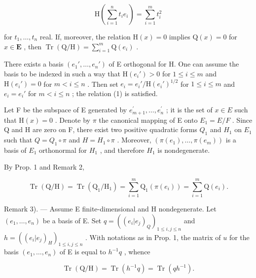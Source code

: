 \[
\mathrm{H} \left(\sum_ {i = 1} ^ {n} t _ {i} e _ {i}\right) = \sum_ {i = 1} ^ {m} t _ {i} ^ {2}\tag{1}
\]

for \(t_1, \ldots, t_n\) real. If, moreover, the relation \(\mathrm{H}(x) = 0\) implies \(\mathrm{Q}(x) = 0\) for \(x \in \mathbf{E}\) , then \(\operatorname{Tr}(\mathrm{Q}/\mathrm{H}) = \sum_{i=1}^{m} \mathrm{Q}(e_i)\) .

There exists a basis \((e_1', \ldots, e_n')\) of E orthogonal for H. One can assume the basis to be indexed in such a way that \(\mathrm{H}(e_i') > 0\) for \(1 \leqslant i \leqslant m\) and \(\mathrm{H}(e_i') = 0\) for \(m < i \leqslant n\) . Then set \(e_i = e_i' / \mathrm{H}(e_i')^{1/2}\) for \(1 \leqslant i \leqslant m\) and \(e_i = e_i'\) for \(m < i \leqslant n\) ; the relation (1) is satisfied.

Let F be the subspace of E generated by \(e_{m+1}^{\prime},\ldots,e_{n}^{\prime}\) ; it is the set of \(x\in E\) such that \(\mathrm{H}(x)=0\) . Denote by \(\pi\) the canonical mapping of E onto \(E_{1}=E/F\) . Since Q and H are zero on F, there exist two positive quadratic forms \(Q_{1}\) and \(H_{1}\) on \(E_{1}\) such that \(Q=Q_{1}\circ\pi\) and \(H=H_{1}\circ\pi\) . Moreover, \((\pi(e_{1}),\ldots,\pi(e_{m}))\) is a basis of \(E_{1}\) orthonormal for \(H_{1}\) , and therefore \(H_{1}\) is nondegenerate.

By Prop. 1 and Remark 2,

\[
\operatorname{Tr} \left(\mathrm{Q} / \mathrm{H}\right) = \operatorname{Tr} \left(\mathrm{Q} _ {1} / \mathrm{H} _ {1}\right) = \sum_ {i = 1} ^ {m} \mathrm{Q} _ {1} \left(\pi (e _ {i})\right) = \sum_ {i = 1} ^ {m} \mathrm{Q} (e _ {i}).\tag{Q.E.D.}
\]

Remark 3). --- Assume E finite-dimensional and H nondegenerate. Let \((e_1, \ldots, e_n)\) be a basis of E. Set \(q = ((e_i | e_j)_Q)_{1 \leqslant i, j \leqslant n}\) and \(h = ((e_i | e_j)_H)_{1 \leqslant i, j \leqslant n}\) . With notations as in Prop. 1, the matrix of \(u\) for the basis \((e_1, \ldots, e_n)\) of E is equal to \(h^{-1}q\) , whence

\[
\operatorname{Tr} \left(\mathrm{Q} / \mathrm{H}\right) = \operatorname{Tr} \left(h ^ {- 1} q\right) = \operatorname{Tr} \left(q h ^ {- 1}\right).\tag{2}
\]

